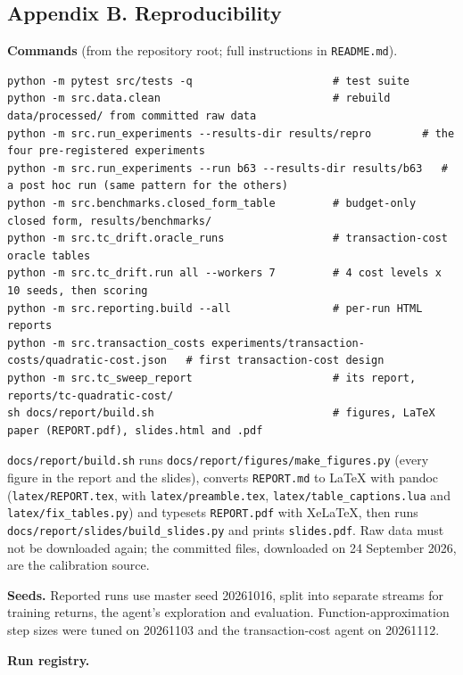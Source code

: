 \documentclass[
  11pt]{article}
\begin{document}
\clearpage

\subsection{Appendix B.
Reproducibility}\label{appendix-b.-reproducibility}

\textbf{Commands} (from the repository root; full instructions in
\texttt{README.md}).

\begin{verbatim}
python -m pytest src/tests -q                      # test suite
python -m src.data.clean                           # rebuild data/processed/ from committed raw data
python -m src.run_experiments --results-dir results/repro        # the four pre-registered experiments
python -m src.run_experiments --run b63 --results-dir results/b63   # a post hoc run (same pattern for the others)
python -m src.benchmarks.closed_form_table         # budget-only closed form, results/benchmarks/
python -m src.tc_drift.oracle_runs                 # transaction-cost oracle tables
python -m src.tc_drift.run all --workers 7         # 4 cost levels x 10 seeds, then scoring
python -m src.reporting.build --all                # per-run HTML reports
python -m src.transaction_costs experiments/transaction-costs/quadratic-cost.json   # first transaction-cost design
python -m src.tc_sweep_report                      # its report, reports/tc-quadratic-cost/
sh docs/report/build.sh                            # figures, LaTeX paper (REPORT.pdf), slides.html and .pdf
\end{verbatim}

\texttt{docs/report/build.sh} runs
\texttt{docs/report/figures/make\_figures.py} (every figure in the
report and the slides), converts \texttt{REPORT.md} to LaTeX with pandoc
(\texttt{latex/REPORT.tex}, with \texttt{latex/preamble.tex},
\texttt{latex/table\_captions.lua} and \texttt{latex/fix\_tables.py})
and typesets \texttt{REPORT.pdf} with XeLaTeX, then runs
\texttt{docs/report/slides/build\_slides.py} and prints
\texttt{slides.pdf}. Raw data must not be downloaded again; the
committed files, downloaded on 24 September 2026, are the calibration
source.

\textbf{Seeds.} Reported runs use master seed 20261016, split into
separate streams for training returns, the agent's exploration and
evaluation. Function-approximation step sizes were tuned on 20261103 and
the transaction-cost agent on 20261112.

\textbf{Run registry.}
\end{document}

